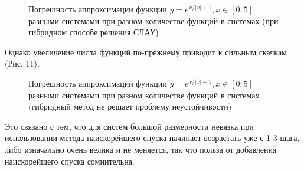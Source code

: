 ﻿\documentclass[a4paper, 12pt]{article}
\begin{document}
\begin{figure}[h!]
    \noindent{}
    \caption{Погрешность аппроксимации функции $y=e^{x/\left|x\right|+1}, x\in[0;5]$ разными системами при разном количестве функций в системах (при гибридном способе решения СЛАУ)}
    \label{figCurves}
\end{figure}
Однако увеличение числа функций по-прежнему приводит к сильным скачкам (Рис. 11).

\begin{figure}[h!]
    \noindent{}
    \caption{Погрешность аппроксимации функции $y=e^{x/\left|x\right|+1}, x\in[0;5]$ разными системами при разном количестве функций в системах (гибридный метод не решает проблему неустойчивости)}
    \label{figCurves}
\end{figure}
Это связано с тем, что для систем большой размерности невязка при использовании метода наискорейшего спуска начинает возрастать уже с 1-3 шага, либо изначально очень велика и не меняется, так что польза от добавления наискорейшего спуска сомнительна.
\end{document}
